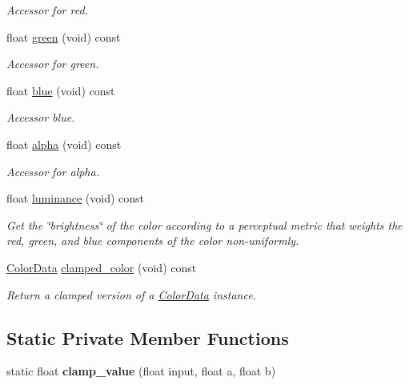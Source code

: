 \begin{DoxyCompactItemize}
\begin{DoxyCompactList}\small\item\em Accessor for red. \end{DoxyCompactList}\item 
float \hyperlink{classimage__tools_1_1ColorData_a2dcb46013051c45a25386383e6d97e94}{green} (void) const 
\begin{DoxyCompactList}\small\item\em Accessor for green. \end{DoxyCompactList}\item 
float \hyperlink{classimage__tools_1_1ColorData_a3b27c4b8e5cf45c388e348fc01c3eeaf}{blue} (void) const 
\begin{DoxyCompactList}\small\item\em Accessor blue. \end{DoxyCompactList}\item 
float \hyperlink{classimage__tools_1_1ColorData_a8ae370ebb683fcfab1ce7dfdac9f78a2}{alpha} (void) const 
\begin{DoxyCompactList}\small\item\em Accessor for alpha. \end{DoxyCompactList}\item 
float \hyperlink{classimage__tools_1_1ColorData_a9bea35824e209d2c216739fdc8b9bf3f}{luminance} (void) const \hypertarget{classimage__tools_1_1ColorData_a9bea35824e209d2c216739fdc8b9bf3f}{}\label{classimage__tools_1_1ColorData_a9bea35824e209d2c216739fdc8b9bf3f}

\begin{DoxyCompactList}\small\item\em Get the \char`\"{}brightness\char`\"{} of the color according to a perceptual metric that weights the red, green, and blue components of the color non-\/uniformly. \end{DoxyCompactList}\item 
\hyperlink{classimage__tools_1_1ColorData}{Color\+Data} \hyperlink{classimage__tools_1_1ColorData_add7ac66b4e579f06f59f03c2206a0429}{clamped\+\_\+color} (void) const 
\begin{DoxyCompactList}\small\item\em Return a clamped version of a \hyperlink{classimage__tools_1_1ColorData}{Color\+Data} instance. \end{DoxyCompactList}\end{DoxyCompactItemize}
\subsection*{Static Private Member Functions}
\begin{DoxyCompactItemize}
\item 
static float {\bfseries clamp\+\_\+value} (float input, float a, float b)\hypertarget{classimage__tools_1_1ColorData_ac9c19726be7a97e13b6916ed26822740}{}\label{classimage__tools_1_1ColorData_ac9c19726be7a97e13b6916ed26822740}

\end{DoxyCompactItemize}
